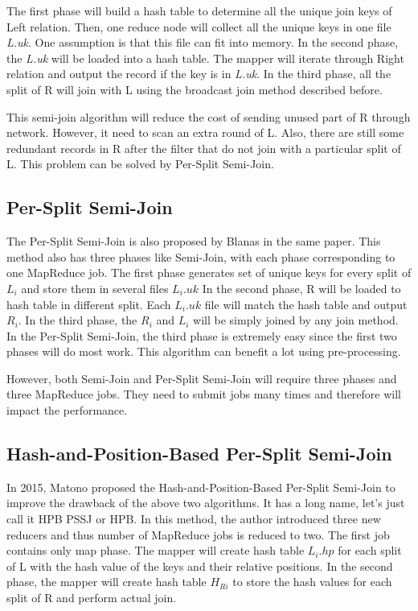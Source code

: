 \documentclass[sigconf, nonacm]{acmart}
\begin{document}
The first phase will build a hash table to determine all the unique join keys of Left relation. Then, one reduce node will collect all the unique keys in one file \textit{L.uk}. One assumption is that this file can fit into memory. In the second phase, the \textit{L.uk} will be loaded into a hash table. The mapper will iterate through Right relation and output the record if the key is in \textit{L.uk}. In the third phase, all the split of R will join with L using the broadcast join method described before. 

This semi-join algorithm will reduce the cost of sending unused part of R through network. However, it need to scan an extra round of L. Also, there are still some redundant records in R after the filter that do not join with a particular split of L. This problem can be solved by Per-Split Semi-Join. 

\subsection{Per-Split Semi-Join}

The Per-Split Semi-Join is also proposed by Blanas in the same paper\cite{blanas2010comparison}. This method also has three phases like Semi-Join, with each phase corresponding to one MapReduce job. The first phase generates set of unique keys for every split of $L_i$ and store them in several files $L_i.uk$ In the second phase, R will be loaded to hash table in different split. Each $L_i.uk$ file will match the hash table and output $R_i$. In the third phase, the $R_i$ and $L_i$ will be simply joined by any join method. In the Per-Split Semi-Join, the third phase is extremely easy since the first two phases will do most work. This algorithm can benefit a lot using pre-processing. 

However, both Semi-Join and Per-Split Semi-Join will require three phases and three MapReduce jobs. They need to submit jobs many times and therefore will impact the performance.

\subsection{Hash-and-Position-Based Per-Split Semi-Join}

In 2015, Matono \cite{matono2015improvement} proposed the Hash-and-Position-Based Per-Split Semi-Join to improve the drawback of the above two algorithms. It has a long name, let's just call it HPB PSSJ or HPB. In this method,  the author introduced three new reducers and thus number of MapReduce jobs is reduced to two. The first job contains only map phase. The mapper will create hash table $L_i.hp$ for each split of L with the hash value of the keys and their relative positions. In the second phase, the mapper will create hash table $H_{Ri}$ to store the hash values for each split of R and perform actual join. 
\end{document}
